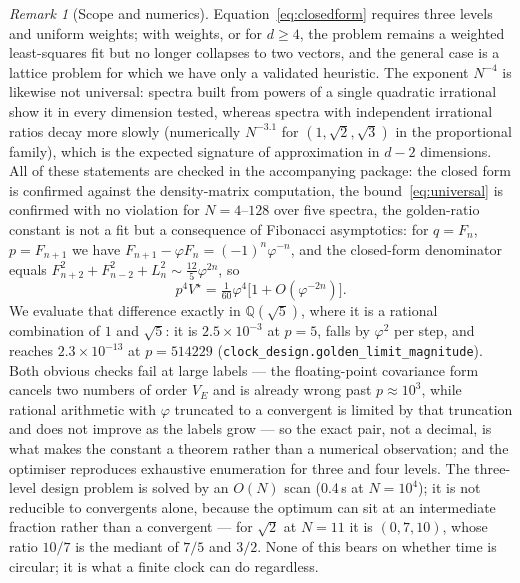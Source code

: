 \documentclass[aps,prd,onecolumn,notitlepage,10pt,amsmath,amssymb,amsfonts,nofootinbib]{revtex4-2}
\theoremstyle{definition}
\theoremstyle{remark}
\newtheorem{remark}{Remark}
\begin{document}
\begin{remark}[Scope and numerics]
\label{rem:scopenumerics}
Equation~\eqref{eq:closedform} requires three levels and uniform weights; with weights, or for $d\ge4$, the problem remains a weighted least-squares fit but no longer collapses to two vectors, and the general case is a lattice problem for which we have only a validated heuristic. The exponent $N^{-4}$ is likewise not universal: spectra built from powers of a single quadratic irrational show it in every dimension tested, whereas spectra with independent irrational ratios decay more slowly (numerically $N^{-3.1}$ for $(1,\sqrt2,\sqrt3)$ in the proportional family), which is the expected signature of approximation in $d-2$ dimensions. All of these statements are checked in the accompanying package: the closed form is confirmed against the density-matrix computation, the bound~\eqref{eq:universal} is confirmed with no violation for $N=4$--$128$ over five spectra, the golden-ratio constant is not a fit but a consequence of Fibonacci asymptotics: for $q=F_n$, $p=F_{n+1}$ we have $F_{n+1}-\varphi F_n=(-1)^n\varphi^{-n}$, and the closed-form denominator equals $F_{n+2}^2+F_{n-2}^2+L_n^2\sim\tfrac{12}{5}\varphi^{2n}$, so
\[
p^4V^\star=\tfrac{1}{60}\varphi^4\bigl[1+O(\varphi^{-2n})\bigr].
\]
We evaluate that difference exactly in $\mathbb{Q}(\sqrt5)$, where it is a rational combination of $1$ and $\sqrt5$: it is $2.5\times10^{-3}$ at $p=5$, falls by $\varphi^2$ per step, and reaches $2.3\times10^{-13}$ at $p=514229$ (\texttt{clock\_design.golden\_limit\_magnitude}). Both obvious checks fail at large labels --- the floating-point covariance form cancels two numbers of order $V_E$ and is already wrong past $p\approx10^3$, while rational arithmetic with $\varphi$ truncated to a convergent is limited by that truncation and does not improve as the labels grow --- so the exact pair, not a decimal, is what makes the constant a theorem rather than a numerical observation; and the optimiser reproduces exhaustive enumeration for three and four levels. The three-level design problem is solved by an $O(N)$ scan (0.4\,s at $N=10^4$); it is not reducible to convergents alone, because the optimum can sit at an intermediate fraction rather than a convergent --- for $\sqrt2$ at $N=11$ it is $(0,7,10)$, whose ratio $10/7$ is the mediant of $7/5$ and $3/2$. None of this bears on whether time is circular; it is what a finite clock can do regardless.
\end{remark}
\end{document}
